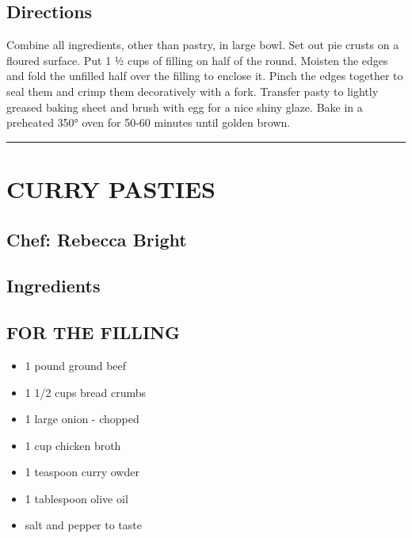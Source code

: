 \documentclass[
]{book}
\providecommand{\tightlist}{%
  \setlength{\itemsep}{0pt}\setlength{\parskip}{0pt}}
\begin{document}
\hypertarget{directions-52}{%
\subsection*{Directions}\label{directions-52}}


Combine all ingredients, other than pastry, in large bowl. Set out pie crusts on a floured surface. Put 1 ½ cups of filling
on half of the round. Moisten the edges and fold the unfilled half over the filling to enclose it. Pinch the edges together
to seal them and crimp them decoratively with a fork. Transfer pasty to lightly greased baking sheet and brush with egg for
a nice shiny glaze. Bake in a preheated 350° oven for 50-60 minutes until golden brown.

\begin{center}\rule{0.5\linewidth}{0.5pt}\end{center}

\hypertarget{curry-pasties}{%
\section*{CURRY PASTIES}\label{curry-pasties}}


\hypertarget{chef-rebecca-bright-1}{%
\subsection*{Chef: Rebecca Bright}\label{chef-rebecca-bright-1}}


\hypertarget{ingredients-53}{%
\subsection*{Ingredients}\label{ingredients-53}}


\hypertarget{for-the-filling}{%
\subsection*{FOR THE FILLING}\label{for-the-filling}}


\begin{itemize}
\tightlist
\item
  1 pound ground beef
\item
  1 1/2 cups bread crumbs
\item
  1 large onion - chopped
\item
  1 cup chicken broth
\item
  1 teaspoon curry owder
\item
  1 tablespoon olive oil
\item
  salt and pepper to taste
\end{itemize}
\end{document}
